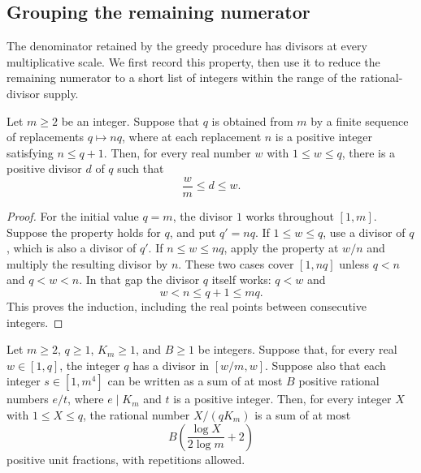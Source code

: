 \subsection{Grouping the remaining numerator}

The denominator retained by the greedy procedure has divisors at every
multiplicative scale.  We first record this property, then use it to reduce
the remaining numerator to a short list of integers within the range of
the rational-divisor supply.

\begin{lemma}\label{lem:marked-divisor-density}
Let $m\ge2$ be an integer.  Suppose that $q$ is obtained from $m$ by a
finite sequence of replacements $q\mapsto nq$, where at each replacement
$n$ is a positive integer satisfying $n\le q+1$.  Then, for every real
number $w$ with $1\le w\le q$, there is a positive divisor $d$ of $q$ such
that
\[
  \frac wm\le d\le w.
\]
\end{lemma}

\begin{proof}
For the initial value $q=m$, the divisor $1$ works throughout $[1,m]$.
Suppose the property holds for $q$, and put $q'=nq$.  If $1\le w\le q$,
use a divisor of $q$, which is also a divisor of $q'$.  If $n\le w\le nq$,
apply the property at $w/n$ and multiply the resulting divisor by $n$.
These two cases cover $[1,nq]$ unless $q<n$ and $q<w<n$.  In that gap
the divisor $q$ itself works: $q<w$ and
\[
  w<n\le q+1\le mq.
\]
This proves the induction, including the real points between consecutive
integers.
\end{proof}

\begin{lemma}\label{lem:marked-grouping}
Let $m\ge2$, $q\ge1$, $K_m\ge1$, and $B\ge1$ be integers.  Suppose that, for every
real $w\in[1,q]$, the integer $q$ has a divisor in $[w/m,w]$.  Suppose
also that each integer $s\in[1,m^4]$ can be written as a sum of at most
$B$ positive rational numbers $e/t$, where $e\mid K_m$ and $t$ is a
positive integer.  Then, for every integer $X$ with $1\le X\le q$, the
rational number $X/(qK_m)$ is a sum of at most
\[
  B\left(\frac{\log X}{2\log m}+2\right)
\]
positive unit fractions, with repetitions allowed.
\end{lemma}


